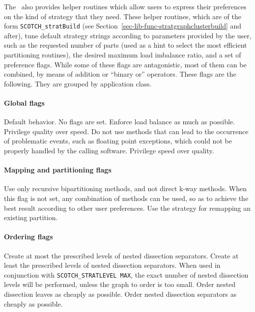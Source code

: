 The \libscotch\ also provides helper routines which allow users to
express their preferences on the kind of strategy that they
need. These helper routines, which are of the form
{\tt SCOTCH\_\lbt strat\lbt *\lbt Build} (see
Section~\ref{sec-lib-func-stratgraphclusterbuild} and after), tune
default strategy strings according to parameters provided by the user,
such as the requested number of parts (used as a hint to select the
most efficient partitioning routines), the desired maximum load
imbalance ratio, and a set of preference flags. While some of these
flags are antagonistic, most of them can be combined, by means of
addition or ``binary or'' operators. These flags are the following.
They are grouped by application class.

\paragraph{Global flags}

\begin{itemize}
Default behavior. No flags are set.
Enforce load balance as much as possible.
Privilege quality over speed.
Do not use methods that can lead to the occurrence of problematic
events, such as floating point exceptions, which could not be properly
handled by the calling software.
Privilege speed over quality.
\end{itemize}

\paragraph{Mapping and partitioning flags}

\begin{itemize}
Use only recursive bipartitioning methods, and not direct k-way
methods. When this flag is not set, any combination of methods can be
used, so as to achieve the best result according to other user
preferences.
Use the strategy for remapping an existing partition.
\end{itemize}

\paragraph{Ordering flags}

\begin{itemize}
Create at most the prescribed levels of nested dissection separators.
Create at least the prescribed levels of nested dissection separators.
When used in conjunction with {\tt SCOTCH\_\lbt STRAT\lbt LEVEL\lbt
MAX}, the exact number of nested dissection levels will be performed,
unless the graph to order is too small.
Order nested dissection leaves as cheaply as possible.
Order nested dissection separators as cheaply as possible.
\end{itemize}

